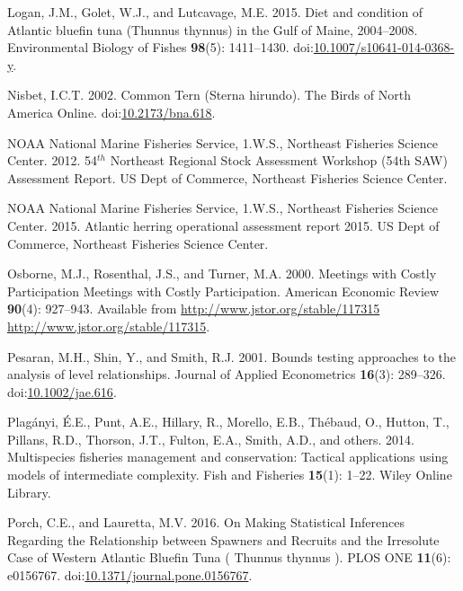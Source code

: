 \documentclass[]{article}
\begin{document}
\hypertarget{ref-logan_diet_2015}{}
Logan, J.M., Golet, W.J., and Lutcavage, M.E. 2015. Diet and condition
of Atlantic bluefin tuna (Thunnus thynnus) in the Gulf of Maine,
2004--2008. Environmental Biology of Fishes \textbf{98}(5): 1411--1430.
doi:\href{https://doi.org/10.1007/s10641-014-0368-y}{10.1007/s10641-014-0368-y}.

\hypertarget{ref-nisbet_common_2002}{}
Nisbet, I.C.T. 2002. Common Tern (Sterna hirundo). The Birds of North
America Online.
doi:\href{https://doi.org/10.2173/bna.618}{10.2173/bna.618}.

\hypertarget{ref-NEFSC2012Assessment}{}
NOAA National Marine Fisheries Service, 1.W.S., Northeast Fisheries
Science Center. 2012. 54\(^{th}\) Northeast Regional Stock Assessment
Workshop (54th SAW) Assessment Report. US Dept of Commerce, Northeast
Fisheries Science Center.

\hypertarget{ref-Deroba2015atlantic}{}
NOAA National Marine Fisheries Service, 1.W.S., Northeast Fisheries
Science Center. 2015. Atlantic herring operational assessment report
2015. US Dept of Commerce, Northeast Fisheries Science Center.

\hypertarget{ref-Osborne2000MeetingsParticipation}{}
Osborne, M.J., Rosenthal, J.S., and Turner, M.A. 2000. Meetings with
Costly Participation Meetings with Costly Participation. American
Economic Review \textbf{90}(4): 927--943. Available from
\href{http://www.jstor.org/stable/117315\%20http://www.jstor.org/stable/117315}{http://www.jstor.org/stable/117315 http://www.jstor.org/stable/117315}.

\hypertarget{ref-Pesaran2001BoundsRelationships}{}
Pesaran, M.H., Shin, Y., and Smith, R.J. 2001. Bounds testing approaches
to the analysis of level relationships. Journal of Applied Econometrics
\textbf{16}(3): 289--326.
doi:\href{https://doi.org/10.1002/jae.616}{10.1002/jae.616}.

\hypertarget{ref-plaganyi2014multispecies}{}
Plagányi, É.E., Punt, A.E., Hillary, R., Morello, E.B., Thébaud, O.,
Hutton, T., Pillans, R.D., Thorson, J.T., Fulton, E.A., Smith, A.D., and
others. 2014. Multispecies fisheries management and conservation:
Tactical applications using models of intermediate complexity. Fish and
Fisheries \textbf{15}(1): 1--22. Wiley Online Library.

\hypertarget{ref-porch_making_2016}{}
Porch, C.E., and Lauretta, M.V. 2016. On Making Statistical Inferences
Regarding the Relationship between Spawners and Recruits and the
Irresolute Case of Western Atlantic Bluefin Tuna ( Thunnus thynnus ).
PLOS ONE \textbf{11}(6): e0156767.
doi:\href{https://doi.org/10.1371/journal.pone.0156767}{10.1371/journal.pone.0156767}.
\end{document}
